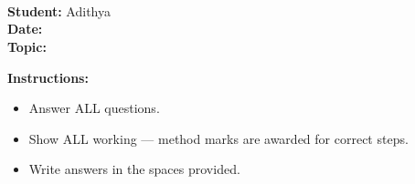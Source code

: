 
\pagestyle{empty}
\begin{center}
    \vspace*{2cm}
    {\Huge \textbf{\examBoard}} \\[5mm]
    {\LARGE \textbf{\examSubject}} \\[3mm]
    {\Large \examPaper} \\[8mm]
    \begin{tcolorbox}[colback=white, colframe=black, arc=4mm, width=0.7\textwidth,
                       boxrule=1.5pt, top=4mm, bottom=4mm]
        \centering
        {\large \textbf{Student:}} Adithya \\[3mm]
        {\large \textbf{Date:}} \examDate \\[3mm]
        {\large \textbf{Topic:}} \examTier
    \end{tcolorbox}
    \vspace{5mm}
    {\large \textbf{Instructions:}}\\[2mm]
    \begin{itemize}[leftmargin=3cm]
        \item Answer ALL questions.
        \item Show ALL working — method marks are awarded for correct steps.
        \item Write answers in the spaces provided.
    \end{itemize}
\end{center}
\newpage
